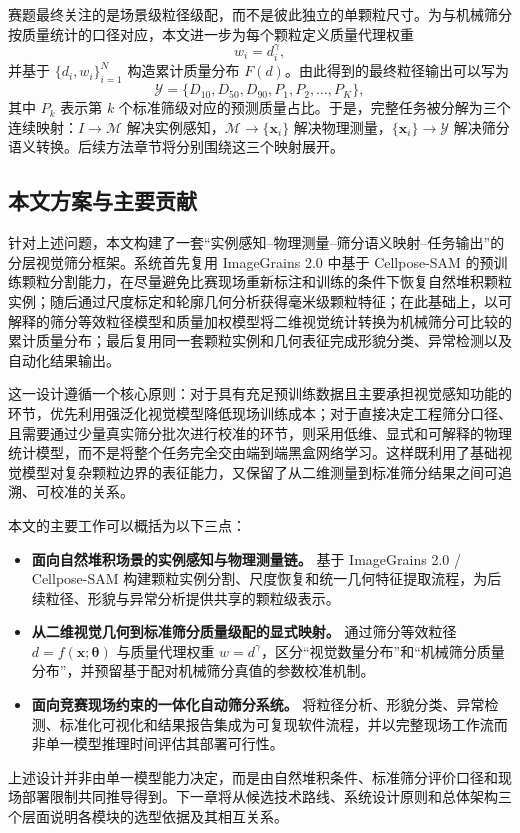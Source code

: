 赛题最终关注的是场景级粒径级配，而不是彼此独立的单颗粒尺寸。为与机械筛分按质量统计的口径对应，本文进一步为每个颗粒定义质量代理权重
\begin{equation}
w_i=d_i^{\gamma},
\label{eq:intro-mass-weight}
\end{equation}
并基于 $\{d_i,w_i\}_{i=1}^{N}$ 构造累计质量分布 $F(d)$。由此得到的最终粒径输出可以写为
\begin{equation}
\mathcal{Y}=\{D_{10},D_{50},D_{90},P_1,P_2,\ldots,P_K\},
\label{eq:scene-output}
\end{equation}
其中 $P_k$ 表示第 $k$ 个标准筛级对应的预测质量占比。于是，完整任务被分解为三个连续映射：$I\rightarrow\mathcal{M}$ 解决实例感知，$\mathcal{M}\rightarrow\{\mathbf{x}_i\}$ 解决物理测量，$\{\mathbf{x}_i\}\rightarrow\mathcal{Y}$ 解决筛分语义转换。后续方法章节将分别围绕这三个映射展开。

\subsection{本文方案与主要贡献}
\label{sec:contributions}

针对上述问题，本文构建了一套“实例感知--物理测量--筛分语义映射--任务输出”的分层视觉筛分框架。系统首先复用 ImageGrains 2.0\cite{mair2026imagegrains2} 中基于 Cellpose-SAM\cite{pachitariu2025cellposeSAM} 的预训练颗粒分割能力，在尽量避免比赛现场重新标注和训练的条件下恢复自然堆积颗粒实例；随后通过尺度标定和轮廓几何分析获得毫米级颗粒特征；在此基础上，以可解释的筛分等效粒径模型和质量加权模型将二维视觉统计转换为机械筛分可比较的累计质量分布；最后复用同一套颗粒实例和几何表征完成形貌分类、异常检测以及自动化结果输出。

这一设计遵循一个核心原则：对于具有充足预训练数据且主要承担视觉感知功能的环节，优先利用强泛化视觉模型降低现场训练成本；对于直接决定工程筛分口径、且需要通过少量真实筛分批次进行校准的环节，则采用低维、显式和可解释的物理统计模型，而不是将整个任务完全交由端到端黑盒网络学习。这样既利用了基础视觉模型对复杂颗粒边界的表征能力，又保留了从二维测量到标准筛分结果之间可追溯、可校准的关系。

本文的主要工作可以概括为以下三点：
\begin{itemize}[leftmargin=2em]
    \item \textbf{面向自然堆积场景的实例感知与物理测量链。} 基于 ImageGrains 2.0 / Cellpose-SAM 构建颗粒实例分割、尺度恢复和统一几何特征提取流程，为后续粒径、形貌与异常分析提供共享的颗粒级表示。
    \item \textbf{从二维视觉几何到标准筛分质量级配的显式映射。} 通过筛分等效粒径 $d=f(\mathbf{x};\boldsymbol{\theta})$ 与质量代理权重 $w=d^{\gamma}$，区分“视觉数量分布”和“机械筛分质量分布”，并预留基于配对机械筛分真值的参数校准机制。
    \item \textbf{面向竞赛现场约束的一体化自动筛分系统。} 将粒径分析、形貌分类、异常检测、标准化可视化和结果报告集成为可复现软件流程，并以完整现场工作流而非单一模型推理时间评估其部署可行性。
\end{itemize}

上述设计并非由单一模型能力决定，而是由自然堆积条件、标准筛分评价口径和现场部署限制共同推导得到。下一章将从候选技术路线、系统设计原则和总体架构三个层面说明各模块的选型依据及其相互关系。
